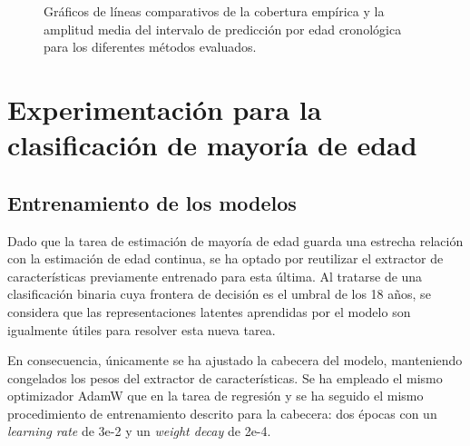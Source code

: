 \begin{figure}[htbp]
    \caption[
        Gráficos de líneas comparativos de la cobertura empírica y la amplitud media del intervalo de predicción por edad cronológica para los diferentes métodos evaluados.
    ]{
        Gráficos de líneas comparativos de la cobertura empírica y la amplitud media del intervalo de predicción por edad cronológica para los diferentes métodos evaluados.
    }
    \label{fig:AE_EC_MPIW_by_true_age}
\end{figure}

\FloatBarrier






\section{Experimentación para la clasificación de mayoría de edad}


\subsection{Entrenamiento de los modelos}

Dado que la tarea de estimación de mayoría de edad guarda una estrecha relación con la estimación de edad continua, se ha optado por reutilizar el extractor de características previamente entrenado para esta última. Al tratarse de una clasificación binaria cuya frontera de decisión es el umbral de los 18 años, se considera que las representaciones latentes aprendidas por el modelo son igualmente útiles para resolver esta nueva tarea.

En consecuencia, únicamente se ha ajustado la cabecera del modelo, manteniendo congelados los pesos del extractor de características. Se ha empleado el mismo optimizador AdamW que en la tarea de regresión y se ha seguido el mismo procedimiento de entrenamiento descrito para la cabecera: dos épocas con un \textit{learning rate} de 3e-2 y un \textit{weight decay} de 2e-4.

